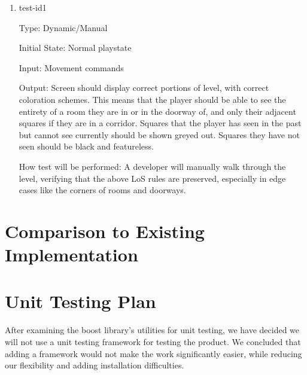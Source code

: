 \documentclass[12pt, titlepage]{article}
\begin{document}
		\begin{enumerate}

		\item{test-id1\\}

		Type: Dynamic/Manual

		Initial State: Normal playstate

		Input: Movement commands

		Output: Screen should display correct portions of level, with correct coloration schemes. This means that the player should be able to see the entirety of a room they are in or in the doorway of, and only their adjacent squares if they are in a corridor. Squares that the player has seen in the past but cannot see currently should be shown greyed out. Squares they have not seen should be black and featureless.

		How test will be performed: A developer will manually walk through the level, verifying that the above LoS rules are preserved, especially in edge cases like the corners of rooms and doorways.

		\end{enumerate} 

\newpage
\section{Comparison to Existing Implementation}	

	
\newpage
\section{Unit Testing Plan}
	
	After examining the boost library's utilities for unit testing, we have decided we will not use a unit testing framework for testing the product. We concluded that adding a framework would not make the work significantly easier, while reducing our flexibility and adding installation difficulties.
	
\end{document}
